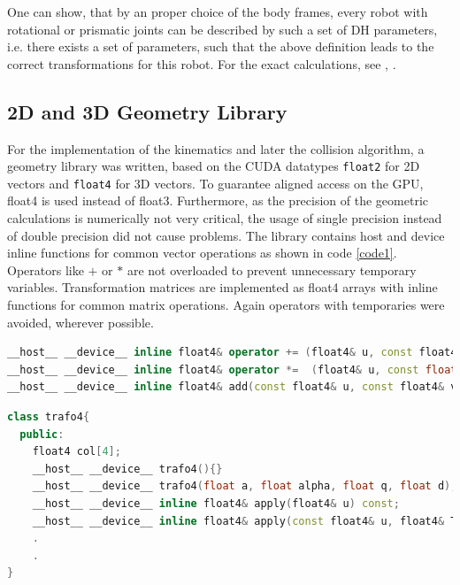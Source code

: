 \documentclass[twocolumn]{svjour3}
\begin{document}
One can show, that by an proper choice of the body frames, every robot with rotational or prismatic joints can be described by such a set of DH parameters, i.e. there exists a set of parameters, such that the above definition leads to the correct transformations for this robot.
For the exact calculations, see \cite{robodyn}, \cite{robodynbuch}.


\subsection{2D and 3D Geometry Library}

For the implementation of the kinematics and later the collision algorithm, a geometry library was written, based on the CUDA datatypes \texttt{float2} for 2D vectors and \texttt{float4} for 3D vectors.
To guarantee aligned access on the GPU, float4 is used instead of float3. 
Furthermore, as the precision of the geometric calculations is numerically not very critical, the usage of single precision instead of double precision did not cause problems.
The library contains host and device inline functions for common vector operations as shown in code \ref{code1}.
Operators like $+$ or $*$ are not overloaded to prevent unnecessary temporary variables.
Transformation matrices are implemented as float4 arrays with inline functions for common matrix operations. Again operators with temporaries were avoided, wherever possible.

\footnotesize
\begin{lstlisting}[language=C++, frame=single, float=*, 
	caption=Operator examples of the written float4 library.,
	label=code1
]
__host__ __device__ inline float4& operator += (float4& u, const float4& v);
__host__ __device__ inline float4& operator *=  (float4& u, const float f);
__host__ __device__ inline float4& add(const float4& u, const float4& v, float4& w);
\end{lstlisting}
\normalsize

\footnotesize
\begin{lstlisting}[language=C++, frame=single, float=*,
	caption=Class structure for a geomeric transformation matrix.,
	label=code2
]
class trafo4{
  public:
    float4 col[4];
    __host__ __device__ trafo4(){}
    __host__ __device__ trafo4(float a, float alpha, float q, float d);
    __host__ __device__ inline float4& apply(float4& u) const;
    __host__ __device__ inline float4& apply(const float4& u, float4& Tu) const;
    .
    .
}
\end{lstlisting}
\normalsize
\end{document}
